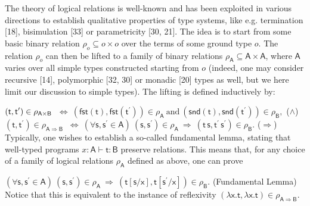 The theory of logical relations is well-known and has been exploited in various directions to establish qualitative properties of type systems, like e.g. termination [18], bisimulation [33] or parametricity [30, 21]. The idea is to start from some basic binary relation $\rho_{o}\subseteq o\times o$ over the terms of some ground type $o$. The relation $\rho_{o}$ can then be lifted to a family of binary relations $\rho_{\mathsf{A}}\subseteq\mathsf{A}\times\mathsf{A}$, where $\mathsf{A}$ varies over all simple types constructed starting from $o$ (indeed, one may consider recursive [14], polymorphic [32, 30] or monadic [20] types as well, but we here limit our discussion to simple types). The lifting is defined inductively by:\par
    $\displaystyle(\mathsf{t},\mathsf{t}^{\prime})\in\rho_{\mathsf{A}\times\mathsf{%
B}}$ $\displaystyle\ \iff\ (\mathsf{fst}(\mathsf{t}),\mathsf{fst}(\mathsf{t}^{\prime%
}))\in\rho_{\mathsf{A}}\ \text{and}\ (\mathsf{snd}(\mathsf{t}),\mathsf{snd}(%
\mathsf{t}^{\prime}))\in\rho_{\mathsf{B}},$  ($\land$)    $\displaystyle(\mathsf{t},\mathsf{t}^{\prime})\in\rho_{\mathsf{A}\Rightarrow%
\mathsf{B}}$ $\displaystyle\ \iff\ (\forall\mathsf{s},\mathsf{s}^{\prime}\in\mathsf{A})\ (%
\mathsf{s},\mathsf{s}^{\prime})\in\rho_{\mathsf{A}}\ \Rightarrow\ (\mathsf{t}%
\,\mathsf{s},\mathsf{t^{\prime}}\,\mathsf{s^{\prime}})\in\rho_{\mathsf{B}}.$  ($\Rightarrow$)   
Typically, one wishes to establish a so-called fundamental lemma, stating that well-typed programs $x:\mathsf{A}\vdash\mathsf{t}:\mathsf{B}$ preserve relations. This means that, for any choice of a family of logical relations $\rho_{\mathsf{A}}$ defined as above, one can prove\par
    $\displaystyle(\forall\mathsf{s},\mathsf{s}^{\prime}\in\mathsf{A})\ (\mathsf{s}%
,\mathsf{s}^{\prime})\in\rho_{\mathsf{A}}\ \Rightarrow\ (\mathsf{t}[\mathsf{s}%
/\mathsf{x}],\mathsf{t}[\mathsf{s}^{\prime}/\mathsf{x}])\in\rho_{\mathsf{B}}.$  (Fundamental Lemma)   
Notice that this is equivalent to the instance of reflexivity $(\lambda\mathsf{x}.\mathsf{t},\lambda\mathsf{x}.\mathsf{t})\in\rho_{\mathsf{A}%
\Rightarrow\mathsf{B}}$.\par
 
 
 
